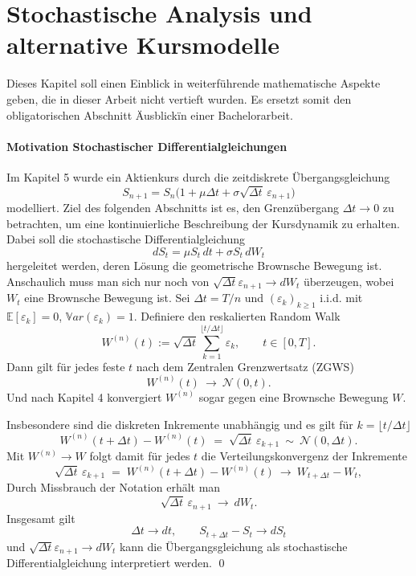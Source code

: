 \section{Stochastische Analysis und alternative Kursmodelle}

Dieses Kapitel soll einen Einblick in weiterführende mathematische Aspekte geben, die in dieser Arbeit nicht vertieft wurden.
Es ersetzt somit den obligatorischen Abschnitt \"Ausblick\" in einer Bachelorarbeit.

\paragraph{Motivation Stochastischer Differentialgleichungen}

Im Kapitel 5 wurde ein Aktienkurs durch die zeitdiskrete Übergangsgleichung
$$S_{n+1} = S_n \big(1 + \mu \Delta t + \sigma \sqrt{\Delta t}\,\varepsilon_{n+1}\big)$$
modelliert. Ziel des folgenden Abschnitts ist es, den Grenzübergang $\Delta t \to 0$ zu betrachten,
um eine kontinuierliche Beschreibung der Kursdynamik zu erhalten. Dabei soll die stochastische Differentialgleichung
$$dS_t = \mu S_t\,dt + \sigma S_t\,dW_t$$
hergeleitet werden, deren Lösung die geometrische Brownsche Bewegung ist. 
Anschaulich muss man sich nur noch von $\sqrt{\Delta t} \varepsilon_{n+1} \to dW_t$ überzeugen, wobei $W_t$ eine Brownsche Bewegung ist.
Sei $\Delta t = T/n$ und $(\varepsilon_k)_{k\ge 1}$ i.i.d. mit $\mathbb E[\varepsilon_k]=0$, $\mathbb Var(\varepsilon_k)=1$.
Definiere den reskalierten Random Walk
$$
W^{(n)}(t) := \sqrt{\Delta t}\sum_{k=1}^{\lfloor t/\Delta t\rfloor}\varepsilon_k,\qquad t\in[0,T].
$$
Dann gilt für jedes feste $t$ nach dem Zentralen Grenzwertsatz (ZGWS)
$$
W^{(n)}(t)\ \to\ \mathcal N(0,t).
$$
Und nach Kapitel 4 konvergiert $W^{(n)}$ sogar gegen eine Brownsche Bewegung $W$.

Insbesondere sind die diskreten Inkremente unabhängig und es gilt für $k=\lfloor t/\Delta t\rfloor$
$$
W^{(n)}(t+\Delta t)-W^{(n)}(t)\;=\;\sqrt{\Delta t}\,\varepsilon_{k+1}\ \sim\ \mathcal N(0,\Delta t).
$$
Mit $W^{(n)}\to W$ folgt damit für jedes $t$ die Verteilungskonvergenz der Inkremente
$$
\sqrt{\Delta t}\,\varepsilon_{k+1}
\;=\;W^{(n)}(t+\Delta t)-W^{(n)}(t)\ \to \ W_{t+\Delta t}-W_t,
$$
Durch Missbrauch der Notation erhält man
$$
\sqrt{\Delta t}\,\varepsilon_{n+1}\ \to\ dW_t.
$$
Insgesamt gilt
$$\Delta t \to dt, \qquad S_{t + \Delta t} - S_t \to dS_t$$
und $\sqrt{\Delta t} \varepsilon_{n+1} \to dW_t$
kann die Übergangsgleichung als stochastische Differentialgleichung interpretiert werden.
\qed

